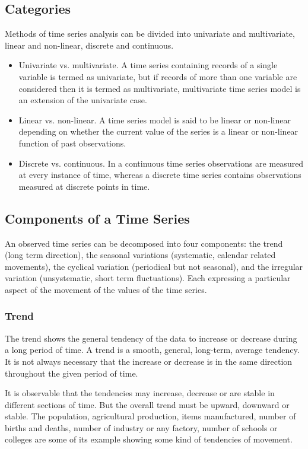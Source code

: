 \subsection{Categories}
Methods of time series analysis can be divided into univariate and multivariate, linear and non-linear, discrete and continuous.
\begin{itemize}
    \item Univariate vs. multivariate. A time series containing records of a single variable is termed as univariate, but if records of more than one variable are considered then it is termed as multivariate, multivariate time series model is an extension of the univariate case.
    \item Linear vs. non-linear. A time series model is said to be linear or non-linear depending on whether the current value of the series is a linear or non-linear function of past observations.
    \item Discrete vs. continuous. In a continuous time series observations are measured at every instance of time, whereas a discrete time series contains
    observations measured at discrete points in time.
\end{itemize}

\subsection{Components of a Time Series}
An observed time series can be decomposed into four components: the trend (long term direction), the seasonal variations (systematic, calendar related movements), the cyclical variation (periodical but not seasonal), and the irregular variation (unsystematic, short term fluctuations). Each expressing a particular aspect of the movement of the values of the time series. 

\subsubsection{Trend}
The trend shows the general tendency of the data to increase or decrease during a long period of time. A trend is a smooth, general, long-term, average tendency. It is not always necessary that the increase or decrease is in the same direction throughout the given period of time.

It is observable that the tendencies may increase, decrease or are stable in different sections of time. But the overall trend must be upward, downward or stable. The population, agricultural production, items manufactured, number of births and deaths, number of industry or any factory, number of schools or colleges are some of its example showing some kind of tendencies of movement.

